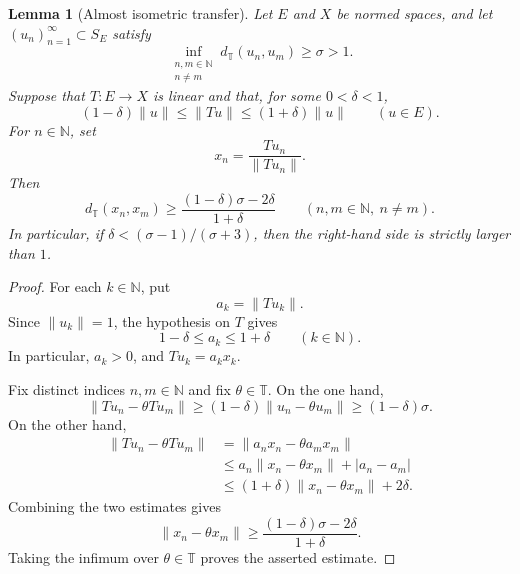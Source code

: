\documentclass[11pt,reqno]{amsart}
\makeatletter
\theoremstyle{plain}
\newtheorem{lemma}[lemma]{Lemma}
\theoremstyle{definition}
\newcommand{\N}{\mathbb N}
\newcommand{\T}{\mathbb T}
\newcommand{\distT}{d_{\mathbb T}}
\newcounter{problempaper}
\newenvironment{problempaperbody}{%
  \setcounter{subsection}{0}%
  \setcounter{subsubsection}{0}%
  \setcounter{paragraph}{0}%
  \renewcommand{\thesubsection}{\arabic{subsection}}%
  \renewcommand{\thesubsubsection}{\thesubsection.\arabic{subsubsection}}%
  \renewcommand{\theparagraph}{\thesubsubsection.\arabic{paragraph}}%
  \let\problem@outersection\section
  \let\problem@outersubsection\subsection
  \let\problem@outersubsubsection\subsubsection
  \let\problem@outerparagraph\paragraph
  \let\section\problem@papersection
  \let\subsection\problem@papersubsection
  \let\subsubsection\problem@papersubsubsection
}{%
  \let\section\problem@outersection
  \let\subsection\problem@outersubsection
  \let\subsubsection\problem@outersubsubsection
  \let\paragraph\problem@outerparagraph
}
\newcommand{\problem@target}[2]{%
  \hypertarget{problem-\theproblempaper-#1-#2}{}%
}
\newcommand{\problem@paperheading}[3]{%
  \par\bigskip
  \problem@target{#1}{#2}%
  \noindent{\large\bfseries #2.\quad #3\par}%
  \nobreak\smallskip
}
\newcommand{\problem@papersubheading}[3]{%
  \par\medskip
  \problem@target{#1}{#2}%
  \noindent{\normalsize\bfseries #2.\quad #3\par}%
  \nobreak\smallskip
}
\newcommand{\problem@papersubsubheading}[3]{%
  \par\smallskip
  \problem@target{#1}{#2}%
  \noindent{\normalsize\itshape #2.\quad #3.\ }%
}
\def\problem@papersection{%
  \@ifstar{\problem@papersectionstar}{\problem@papersectionnostar}%
}
\def\problem@papersectionstar#1{%
  \par\bigskip\noindent{\large\bfseries #1\par}\nobreak\smallskip
}
\def\problem@papersectionnostar#1{%
  \refstepcounter{subsection}%
  \setcounter{subsubsection}{0}%
  \setcounter{paragraph}{0}%
  \problem@paperheading{section}{\thesubsection}{#1}%
  \problem@writecontentsline{section}{\thesubsection}{#1}%
}
\def\problem@papersubsection{%
  \@ifstar{\problem@papersubsectionstar}{\problem@papersubsectionnostar}%
}
\def\problem@papersubsectionstar#1{%
  \par\medskip\noindent{\normalsize\bfseries #1\par}\nobreak\smallskip
}
\def\problem@papersubsectionnostar#1{%
  \refstepcounter{subsubsection}%
  \setcounter{paragraph}{0}%
  \problem@papersubheading{subsection}{\thesubsubsection}{#1}%
  \problem@writecontentsline{subsection}{\thesubsubsection}{#1}%
}
\def\problem@papersubsubsection{%
  \@ifstar{\problem@papersubsubsectionstar}{\problem@papersubsubsectionnostar}%
}
\def\problem@papersubsubsectionstar#1{%
  \par\smallskip\noindent{\normalsize\itshape #1.\ }%
}
\def\problem@papersubsubsectionnostar#1{%
  \refstepcounter{paragraph}%
  \problem@papersubsubheading{subsubsection}{\theparagraph}{#1}%
  \problem@writecontentsline{subsubsection}{\theparagraph}{#1}%
}
\newcommand{\problem@writecontentsline}[3]{%
  \begingroup
  \protected@write\@auxout{}{%
    \string\problemcontentsentry{\theproblempaper}{#1}{#2}{#3}{\thepage}%
  }%
  \endgroup
}
\newcommand{\problemcontentsentry}[5]{%
  \@ifundefined{problemcontents@#1}{%
    \expandafter\gdef\csname problemcontents@#1\endcsname{}%
  }{}%
  \expandafter\g@addto@macro\csname problemcontents@#1\endcsname{%
    \problemcontentsline{#1}{#2}{#3}{#4}{#5}%
  }%
}
\newcommand{\problemcontentslink}[4]{%
  \hyperlink{problem-#1-#2-#3}{#4}%
}
\newcommand{\problemcontentsline}[5]{%
  \ifstrequal{#2}{section}{%
    \par\noindent
    \problemcontentslink{#1}{#2}{#3}{\makebox[2.5em][l]{#3}#4}%
    \nobreak\dotfill
    \problemcontentslink{#1}{#2}{#3}{#5}\par
  }{%
    \ifstrequal{#2}{subsection}{%
      \par\noindent\hspace*{1.5em}%
      \problemcontentslink{#1}{#2}{#3}{\makebox[3.5em][l]{#3}#4}%
      \nobreak\dotfill
      \problemcontentslink{#1}{#2}{#3}{#5}\par
    }{%
      \par\noindent\hspace*{3em}%
      \problemcontentslink{#1}{#2}{#3}{\makebox[4.5em][l]{#3}#4}%
      \nobreak\dotfill
      \problemcontentslink{#1}{#2}{#3}{#5}\par
    }%
  }%
}
\makeatother
\begin{document}
\begin{problempaperbody}
\begin{lemma}[Almost isometric transfer]
\label{p1-first:lem:transfer}
Let $E$ and $X$ be normed spaces, and let $(u_n)_{n=1}^{\infty}\subset S_E$ satisfy
\begin{equation*}
        \inf_{\substack{n,m\in\N\\ n\ne m}}\distT(u_n,u_m)\ge \sigma>1.
\end{equation*}
Suppose that $T\colon E\to X$ is linear and that, for some $0<\delta<1$,
\begin{equation*}
        (1-\delta)\|u\|\leq \|Tu\|\leq (1+\delta)\|u\| \qquad(u\in E).
\end{equation*}
For $n\in\N$, set
\begin{equation*}
        x_n=\frac{Tu_n}{\|Tu_n\|}.
\end{equation*}
Then
\begin{equation*}
        \distT(x_n,x_m)\ge \frac{(1-\delta)\sigma-2\delta}{1+\delta} \qquad(n,m\in\N,\ n\ne m).
\end{equation*}
In particular, if $\delta<(\sigma-1)/(\sigma+3)$, then the right-hand side is strictly larger than $1$.
\end{lemma}

\begin{proof}
For each $k\in\N$, put
\begin{equation*}
        a_k=\|Tu_k\|.
\end{equation*}
Since $\|u_k\|=1$, the hypothesis on $T$ gives
\begin{equation*}
        1-\delta\leq a_k\leq 1+\delta \qquad(k\in\N).
\end{equation*}
In particular, $a_k>0$, and $Tu_k=a_kx_k$.

Fix distinct indices $n,m\in\N$ and fix $\theta\in\T$. On the one hand,
\begin{equation*}
        \|Tu_n-\theta Tu_m\|\geq (1-\delta)\|u_n-\theta u_m\|\geq (1-\delta)\sigma.
\end{equation*}
On the other hand,
\begin{equation*}
\begin{aligned}
        \|Tu_n-\theta Tu_m\|&=\|a_nx_n-\theta a_mx_m\|\\
        &\leq a_n\|x_n-\theta x_m\|+|a_n-a_m|\\
        &\leq (1+\delta)\|x_n-\theta x_m\|+2\delta.
\end{aligned}
\end{equation*}
Combining the two estimates gives
\begin{equation*}
        \|x_n-\theta x_m\|\geq \frac{(1-\delta)\sigma-2\delta}{1+\delta}.
\end{equation*}
Taking the infimum over $\theta\in\T$ proves the asserted estimate.
\end{proof}


\end{problempaperbody}
\end{document}
